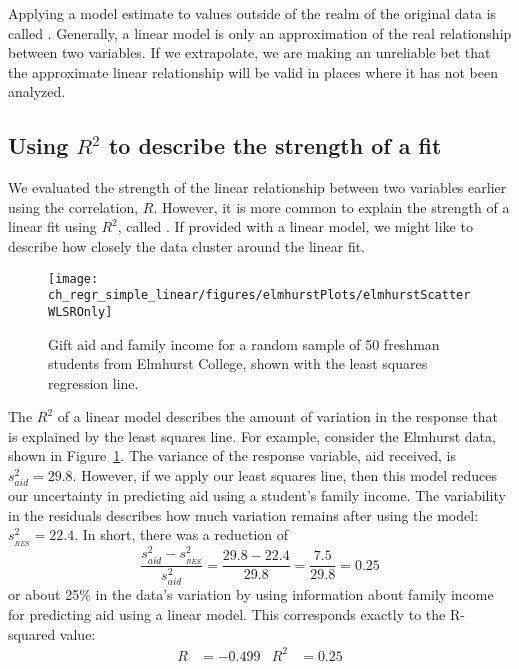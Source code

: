 Applying a model estimate to values outside of the realm of the original data is called . Generally, a linear model is only an approximation of the real relationship between two variables. If we extrapolate, we are making an unreliable bet that the approximate linear relationship will be valid in places where it has not been analyzed.


\subsection{Using $R^2$ to describe the strength of a fit}


We evaluated the strength of the linear relationship between two variables earlier using the correlation, $R$. However, it is more common to explain the strength of a linear fit using $R^2$, called . If provided with a linear model, we might like to describe how closely the data cluster around the linear fit.

\begin{figure}
\centering
\texttt{[image: ch\_regr\_simple\_linear/figures/elmhurstPlots/elmhurstScatterWLSROnly]}
\caption{Gift aid and family income for a random sample of 50 freshman students from Elmhurst College, shown with the least squares regression line.}
\label{elmhurstScatterWLSROnly}
\end{figure}

The $R^2$ of a linear model describes the amount of variation in the response that is explained by the least squares line. For example, consider the Elmhurst data, shown in Figure~\ref{elmhurstScatterWLSROnly}. The variance of the response variable, aid received, is $s_{aid}^2=29.8$. However, if we apply our least squares line, then this model reduces our uncertainty in predicting aid using a student's family income. The variability in the residuals describes how much variation remains after using the model: $s_{_{RES}}^2 = 22.4$. In short, there was a reduction of
$$\frac{s_{aid}^2 - s_{_{RES}}^2}{s_{aid}^2}
	= \frac{29.8 - 22.4}{29.8} = \frac{7.5}{29.8}
	= 0.25$$
or about  25\% in the data's variation by using information about family income for predicting aid using a linear model. This corresponds exactly to the R-squared value:
\begin{align*}
R &= -0.499 &R^2 &= 0.25
\end{align*}

